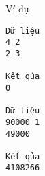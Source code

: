 Ví dụ
\begin{verbatim}
Dữ liệu
4 2
2 3

Kết qủa
0

Dữ liệu
90000 1
49000

Kết qủa
4108266
\end{verbatim}